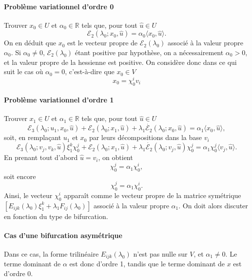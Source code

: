 \documentclass{article}
\begin{document}
\paragraph{Problème variationnel d'ordre 0}Trouver $x_0∈U$ et
$α_0∈\mathbb{R}$ tels que, pour tout $\hat{u}∈U$
\begin{equation} ℰ_2 (λ_0 ; x_0, \hat{u}) = α_0  \langle x_0, \hat{u}
   \rangle . \end{equation}
On en déduit que $x_0$ est le vecteur propre de $ℰ_2
(λ_0)$ associé à la valeur propre $α_0$. Si $α_0 \neq
0$, $ℰ_2  (λ_0)$ étant positive par hypothèse, on a
nécessairement $α_0 > 0$, et la valeur propre de la hessienne est
positive. On considère donc dans ce qui suit le cas où $α_0 = 0$,
c'est-à-dire que $x_0∈V$
\begin{equation} x_0 = \chi_0^i v_i \end{equation}


\paragraph{Problème variationnel d'ordre 1}Trouver $x_1∈U$ et
$α_1∈\mathbb{R}$ tels que, pour tout $\hat{u}∈U$
\begin{equation} ℰ_3 (λ_0 ; u_1, x_0, \hat{u}) +ℰ_2 (λ_0 ;
   x_1, \hat{u}) + λ_1  \dot{ℰ_2} (λ_0 ; x_0, \hat{u}) =
   α_1  \langle x_0, \hat{u} \rangle, \end{equation}
soit, en rempla{\c c}ant $u_1$ et $x_0$ par leurs décompositions dans la
base $v_i$
\begin{equation} ℰ_3 (λ_0 ; v_j, v_k, \hat{u}) ξ_1^k \chi_0^j
   +ℰ_2 (λ_0 ; x_1, \hat{u}) + λ_1  \dot{ℰ_2}
   (λ_0 ; v_j, \hat{u}) \chi_0^j = α_1 \chi_0^j  \langle v_j,
   \hat{u} \rangle . \end{equation}
En prenant tout d'abord $\hat{u} = v_i$, on obtient
\begin{equation} [ℰ_3 (λ_0 ; v_i, v_j, v_k) ξ_1^k + λ_1
   \dot{ℰ_2} (λ_0 ; v_i, v_j)] \chi_0^j = α_1 \chi_0^i,
\end{equation}
soit encore
\begin{equation} [E_{i  j  k} (λ_0) ξ_1^k + λ_1 F_{i
   j} (λ_0)] \chi_0^j = α_1 \chi_0^i . \end{equation}
Ainsi, le vecteur $\chi_0^i$ apparaît comme le vecteur propre de la
matrice symétrique $[E_{i  j  k} (λ_0) ξ_1^k +
λ_1 F_{i  j} (λ_0)]$ associé à la valeur propre
$α_1$. On doit alors discuter en fonction du type de bifurcation.

\paragraph{Cas d'une bifurcation asymétrique}Dans ce cas, la forme
trilinéaire $E_{i  j  k} (λ_0)$ n'est pas nulle sur
$V$, et $α_1 \neq 0$. Le terme dominant de $α$ est donc d'ordre 1,
tandis que le terme dominant de $x$ est d'ordre 0.
\end{document}

